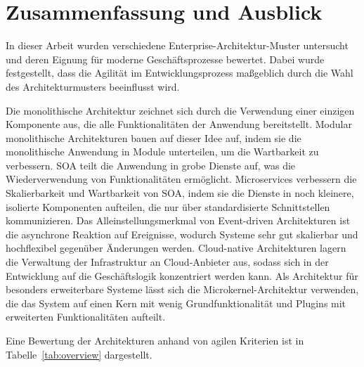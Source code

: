 \documentclass[acmtog]{acmart}
\begin{document}
\section{Zusammenfassung und Ausblick}
\label{sec:summary}
In dieser Arbeit wurden verschiedene Enterprise-Architektur-Muster untersucht und deren Eignung für moderne Geschäftsprozesse bewertet.
Dabei wurde festgestellt, dass die Agilität im Entwicklungsprozess maßgeblich durch die Wahl des Architekturmusters beeinflusst wird.

Die monolithische Architektur zeichnet sich durch die Verwendung einer einzigen Komponente aus, die alle Funktionalitäten der Anwendung bereitstellt.
Modular monolithische Architekturen bauen auf dieser Idee auf, indem sie die monolithische Anwendung in Module unterteilen, um die Wartbarkeit zu verbessern.
SOA teilt die Anwendung in grobe Dienste auf, was die Wiederverwendung von Funktionalitäten ermöglicht.
Microservices verbessern die Skalierbarkeit und Wartbarkeit von SOA, indem sie die Dienste in noch kleinere, isolierte Komponenten aufteilen, die nur über standardisierte Schnittstellen kommunizieren.
Das Alleinstellungsmerkmal von Event-driven Architekturen ist die asynchrone Reaktion auf Ereignisse, wodurch Systeme sehr gut skalierbar und hochflexibel gegenüber Änderungen werden.
Cloud-native Architekturen lagern die Verwaltung der Infrastruktur an Cloud-Anbieter aus, sodass sich in der Entwicklung auf die Geschäftslogik konzentriert werden kann.
Als Architektur für besonders erweiterbare Systeme lässt sich die Microkernel-Architektur verwenden, die das System auf einen Kern mit wenig Grundfunktionalität und Plugins mit erweiterten Funktionalitäten aufteilt.

Eine Bewertung der Architekturen anhand von agilen Kriterien ist in Tabelle~\ref{tab:overview} dargestellt.
\end{document}
